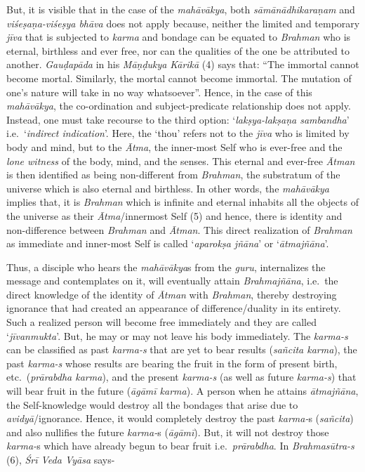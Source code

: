 But, it is visible that in the case of the \emph{mahāvākya}, both \emph{sāmānādhi\-karaṇam} and \emph{viśeṣaṇa-viśeṣya bhāva} does not apply because, neither the limited and temporary \emph{jīva} that is subjected to \emph{karma} and bondage can be equated to \emph{Brahman} who is eternal, birthless and ever free, nor can the qualities of the one be attributed to another. \emph{Gauḍapāda} in his \emph{Māṇḍukya} \emph{Kārikā} (4) says that: ``The immortal cannot become mortal. Similarly, the mortal cannot become immortal. The mutation of one's nature will take in no way whatsoever''. Hence, in the case of this \emph{mahāvākya}, the co-ordination and subject-predicate relationship does not apply. Instead, one must take recourse to the third option: `\emph{lakṣya-lakṣaṇa sambandha}' i.e.\ `\emph{indirect indication}'. Here, the `thou' refers not to the \emph{jīva} who is limited by body and mind, but to the \emph{Ātma}, the inner-most Self who is ever-free and the \emph{lone witness} of the body, mind, and the senses. This eternal and ever-free \emph{Ātman} is then identified as being non-different from \emph{Brahman}, the substratum of the universe which is also eternal and birthless. In other words, the \emph{mahāvākya} implies that, it is \emph{Brahman} which is infinite and eternal inhabits all the objects of the universe as their \emph{Ātma}/innermost Self (5) and hence, there is identity and non-difference between \emph{Brahman} and \emph{Ātman}. This direct realization of \emph{Brahman} as immediate and inner-most Self is called `\emph{aparokṣa jñāna}' or `\emph{ātmajñāna}'.

Thus, a disciple who hears the \emph{mahāvākya}s from the \emph{guru}, internalizes the message and contemplates on it, will eventually attain \emph{Brahmajñāna}, i.e.\ the direct knowledge of the identity of \emph{Ātman} with \emph{Brahman}, thereby destroying ignorance that had created an appearance of difference/duality in its entirety. Such a realized person will become free immediately and they are called `\emph{jīvanmukta}'. But, he may or may not leave his body immediately. The \emph{karma-s} can be classified as past \emph{karma-s} that are yet to bear results (\emph{sañcita karma}), the past \emph{karma-s} whose results are bearing the fruit in the form of present birth, etc.\ (\emph{prārabdha karma}), and the present \emph{karma-s} (as well as future \emph{karma-s}) that will bear fruit in the future (\emph{āgāmī karma}). A person when he attains \emph{ātmajñāna}, the Self-knowledge would destroy all the bondages that arise due to \emph{avidyā}/ignorance. Hence, it would completely destroy the past \emph{karma-}s (\emph{sañcita}) and also nullifies the future \emph{karma-}s (\emph{āgāmī}). But, it will not destroy those \emph{karma-}s which have already begun to bear fruit i.e.\ \emph{prārabdha}. In \emph{Brahmasūtra-s} (6), \emph{Śrī Veda Vyāsa} says-

